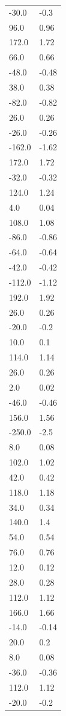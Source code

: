 \begin{longtable}{ll}
-30.0 & -0.3 \\
96.0 & 0.96 \\
172.0 & 1.72 \\
66.0 & 0.66 \\
-48.0 & -0.48 \\
38.0 & 0.38 \\
-82.0 & -0.82 \\
26.0 & 0.26 \\
-26.0 & -0.26 \\
-162.0 & -1.62 \\
172.0 & 1.72 \\
-32.0 & -0.32 \\
124.0 & 1.24 \\
4.0 & 0.04 \\
108.0 & 1.08 \\
-86.0 & -0.86 \\
-64.0 & -0.64 \\
-42.0 & -0.42 \\
-112.0 & -1.12 \\
192.0 & 1.92 \\
26.0 & 0.26 \\
-20.0 & -0.2 \\
10.0 & 0.1 \\
114.0 & 1.14 \\
26.0 & 0.26 \\
2.0 & 0.02 \\
-46.0 & -0.46 \\
156.0 & 1.56 \\
-250.0 & -2.5 \\
8.0 & 0.08 \\
102.0 & 1.02 \\
42.0 & 0.42 \\
118.0 & 1.18 \\
34.0 & 0.34 \\
140.0 & 1.4 \\
54.0 & 0.54 \\
76.0 & 0.76 \\
12.0 & 0.12 \\
28.0 & 0.28 \\
112.0 & 1.12 \\
166.0 & 1.66 \\
-14.0 & -0.14 \\
20.0 & 0.2 \\
8.0 & 0.08 \\
-36.0 & -0.36 \\
112.0 & 1.12 \\
-20.0 & -0.2 \\

\end{longtable}
